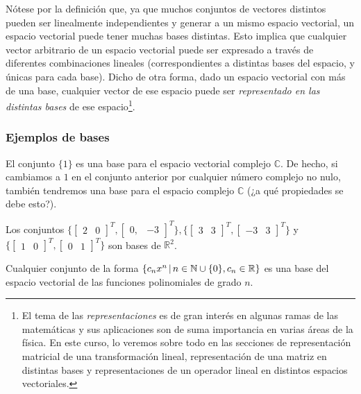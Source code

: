 \documentclass[12pt]{article}
\begin{document}
Nótese por la definición que, ya que muchos conjuntos de vectores distintos pueden ser linealmente independientes y generar a un mismo espacio vectorial, un espacio vectorial puede tener muchas bases distintas. Esto implica que cualquier vector arbitrario de un espacio vectorial puede ser expresado a través de diferentes combinaciones lineales (correspondientes a distintas bases del espacio, y únicas para cada base). Dicho de otra forma, dado un espacio vectorial con más de una base, cualquier vector de ese espacio puede ser \emph{representado en las distintas bases} de ese espacio\footnote{El tema de las \emph{representaciones} es de gran interés en algunas ramas de las matemáticas y sus aplicaciones son de suma importancia en varias áreas de la física. En este curso, lo veremos sobre todo en las secciones de representación matricial de una transformación lineal, representación de una matriz en distintas bases y representaciones de un operador lineal en distintos espacios vectoriales.}.

\subsubsection{Ejemplos de bases} \label{Ejem:Bases}

El conjunto $\{1\}$ es una base para el espacio vectorial complejo $\mathbb{C}.$ De hecho, si cambiamos a $1$ en el conjunto anterior por cualquier número complejo no nulo, también tendremos una base para el espacio complejo $\mathbb{C}$ (¿a qué propiedades se debe esto?). 
\vspace{3mm}

Los conjuntos $\{\begin{bmatrix} 2 & 0 \end{bmatrix}^T, \begin{bmatrix} 0, & -3 \end{bmatrix}^T\}, \{\begin{bmatrix} 3 & 3 \end{bmatrix}^T, \begin{bmatrix} -3 & 3 \end{bmatrix}^T\}$ y $\{\begin{bmatrix} 1 & 0 \end{bmatrix}^T,\begin{bmatrix} 0 & 1 \end{bmatrix}^T\}$ son bases de $\mathbb{R}^2$.
\vspace{3mm}

Cualquier conjunto de la forma $\{c_n x^n\hspace{0.5mm}|\hspace{0.5mm}n\in\mathbb{N}\cup\{0\}, c_n\in \mathbb{R}\}$ es una base del espacio vectorial de las funciones polinomiales de grado $n$.
\end{document}
